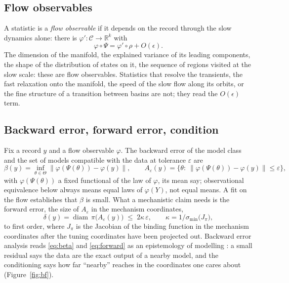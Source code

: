 \documentclass[10pt]{article}
\begin{document}
\subsection{Flow observables}
A statistic is a \emph{flow observable} if it depends on the record through the slow dynamics alone: there is $\varphi':\mathcal{C}\to\mathbb{R}^k$ with
\begin{equation}
\varphi\circ\Psi=\varphi'\circ\rho+O(\epsilon).
\label{eq:flowobs}
\end{equation}
The dimension of the manifold, the explained variance of its leading components, the shape of the distribution of states on it, the sequence of regions visited at the slow scale: these are flow observables. Statistics that resolve the transients, the fast relaxation onto the manifold, the speed of the slow flow along its orbits, or the fine structure of a transition between basins are not; they read the $O(\epsilon)$ term.

\subsection{Backward error, forward error, condition}
Fix a record $y$ and a flow observable $\varphi$. The backward error of the model class and the set of models compatible with the data at tolerance $\varepsilon$ are
\begin{equation}
\beta(y)=\inf_{\theta\in\Theta}\bigl\|\varphi(\Psi(\theta))-\varphi(y)\bigr\|,\qquad
A_\varepsilon(y)=\bigl\{\theta:\ \|\varphi(\Psi(\theta))-\varphi(y)\|\le\varepsilon\bigr\},
\label{eq:beta}
\end{equation}
with $\varphi(\Psi(\theta))$ a fixed functional of the law of $\varphi$, its mean say; observational equivalence below always means equal laws of $\varphi(Y)$, not equal means. A fit on the flow establishes that $\beta$ is small. What a mechanistic claim needs is the forward error, the size of $A_\varepsilon$ in the mechanism coordinates,
\begin{equation}
\delta(y)=\operatorname{diam}\,\pi\bigl(A_\varepsilon(y)\bigr)\;\le\;2\kappa\,\varepsilon,\qquad
\kappa=1\big/\sigma_{\min}\!\bigl(J_\pi\bigr),
\label{eq:forward}
\end{equation}
to first order, where $J_\pi$ is the Jacobian of the binding function in the mechanism coordinates after the tuning coordinates have been projected out. Backward error analysis reads \eqref{eq:beta} and \eqref{eq:forward} as an epistemology of modelling \parencite{fillion2014,fillion2018}: a small residual says the data are the exact output of a nearby model, and the conditioning says how far ``nearby'' reaches in the coordinates one cares about (Figure~\ref{fig:bf}).
\end{document}
